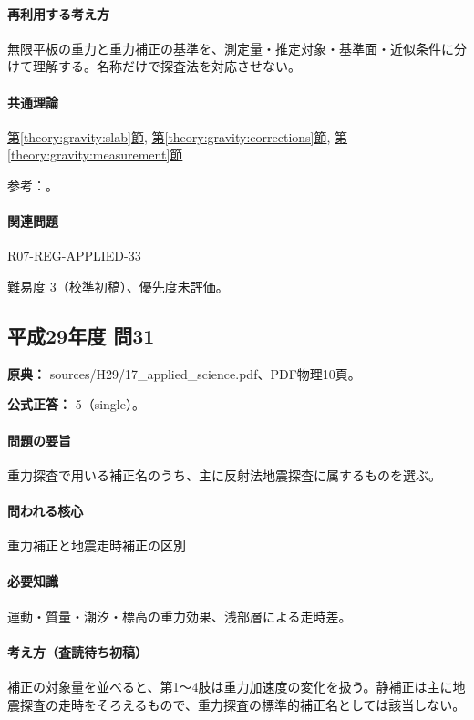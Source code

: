 \paragraph{再利用する考え方} 無限平板の重力と重力補正の基準を、測定量・推定対象・基準面・近似条件に分けて理解する。名称だけで探査法を対応させない。

\paragraph{共通理論} \hyperref[theory:gravity:slab]{第\ref*{theory:gravity:slab}節}, \hyperref[theory:gravity:corrections]{第\ref*{theory:gravity:corrections}節}, \hyperref[theory:gravity:measurement]{第\ref*{theory:gravity:measurement}節}

\par 参考：\cite{gsi_gravity_definitions}。

\paragraph{関連問題} \hyperref[q:r07-reg-applied-33]{R07-REG-APPLIED-33}

\par 難易度 3（校準初稿）、優先度未評価。

\subsection{平成29年度 問31}
\label{q:h29-reg-applied-31}

\noindent\textbf{原典：} sources/H29/17\_applied\_science.pdf、PDF物理10頁。

\textbf{公式正答：} 5（single）。

\paragraph{問題の要旨} 重力探査で用いる補正名のうち、主に反射法地震探査に属するものを選ぶ。

\paragraph{問われる核心} 重力補正と地震走時補正の区別

\paragraph{必要知識} 運動・質量・潮汐・標高の重力効果、浅部層による走時差。

\paragraph{考え方（査読待ち初稿）} 補正の対象量を並べると、第1〜4肢は重力加速度の変化を扱う。静補正は主に地震探査の走時をそろえるもので、重力探査の標準的補正名としては該当しない。

